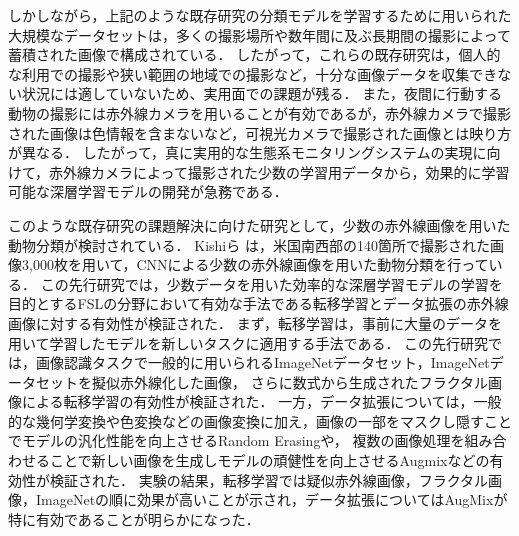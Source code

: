 \documentclass[a4paper,11pt,nomag]{jsreport}
\begin{document}
しかしながら，上記のような既存研究の分類モデルを学習するために用いられた大規模なデータセットは，多くの撮影場所や数年間に及ぶ長期間の撮影によって蓄積された画像で構成されている．
したがって，これらの既存研究は，個人的な利用での撮影や狭い範囲の地域での撮影など，十分な画像データを収集できない状況には適していないため、実用面での課題が残る．
また，夜間に行動する動物の撮影には赤外線カメラを用いることが有効であるが，赤外線カメラで撮影された画像は色情報を含まないなど，可視光カメラで撮影された画像とは映り方が異なる．
したがって，真に実用的な生態系モニタリングシステムの実現に向けて，赤外線カメラによって撮影された少数の学習用データから，効果的に学習可能な深層学習モデルの開発が急務である．

このような既存研究の課題解決に向けた研究として，少数の赤外線画像を用いた動物分類が検討されている．
Kishiら \cite{kishimoto2023}は，米国南西部の140箇所で撮影された画像3,000枚を用いて，CNNによる少数の赤外線画像を用いた動物分類を行っている．
この先行研究では，少数データを用いた効率的な深層学習モデルの学習を目的とするFSLの分野において有効な手法である転移学習とデータ拡張の赤外線画像に対する有効性が検証された．
まず，転移学習は，事前に大量のデータを用いて学習したモデルを新しいタスクに適用する手法である．
この先行研究では，画像認識タスクで一般的に用いられるImageNetデータセット，ImageNetデータセットを擬似赤外線化した画像，
さらに数式から生成されたフラクタル画像による転移学習の有効性が検証された．
一方，データ拡張については，一般的な幾何学変換や色変換などの画像変換に加え，画像の一部をマスクし隠すことでモデルの汎化性能を向上させるRandom Erasingや，
複数の画像処理を組み合わせることで新しい画像を生成しモデルの頑健性を向上させるAugmixなどの有効性が検証された．
実験の結果，転移学習では疑似赤外線画像，フラクタル画像，ImageNetの順に効果が高いことが示され，データ拡張についてはAugMixが特に有効であることが明らかになった．
\end{document}
